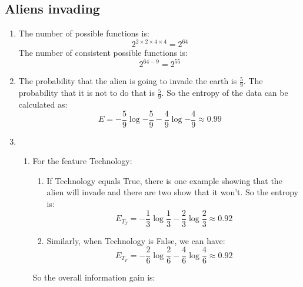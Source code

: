 \documentclass{article}[12pt]
\begin{document}
	\subsection{Aliens invading}
        \begin{enumerate}
            \item The number of possible functions is:
                \begin{displaymath}
                    2^{2 \times 2 \times 4 \times 4} = 2^{64}
                \end{displaymath}
                The number of consistent possible functions is:
                \begin{displaymath}
                    2^{64 - 9} = 2^{55}
                \end{displaymath}
            \item The probability that the alien is going to invade the earth is $\frac{5}{9}$. The probability that it is not to do that is $\frac{5}{9}$. So the entropy of the data can be calculated as:
                \begin{displaymath}
                    E = -\frac{5}{9}\log{-\frac{5}{9}} - \frac{4}{9} \log{-\frac{4}{9}} \approx 0.99
                \end{displaymath}
            \item \begin{enumerate}
                \item For the feature Technology:
                    \begin{enumerate}
                        \item If Technology equals True, there is one example showing that the alien will invade and there are two show that it won't. So the entropy is:
                        \begin{displaymath}
                            E_{T_T} = -\frac{1}{3}\log{\frac{1}{3}} - \frac{2}{3}\log{\frac{2}{3}} \approx 0.92
                        \end{displaymath}
                        \item Similarly, when Technology is False, we can have:
                        \begin{displaymath}
                            E_{T_F} = -\frac{2}{6}\log{\frac{2}{6}} - \frac{4}{6}\log{\frac{4}{6}} \approx 0.92
                        \end{displaymath}
                    \end{enumerate}
                    So the overall information gain is:

\end{enumerate}
\end{enumerate}
\end{document}
